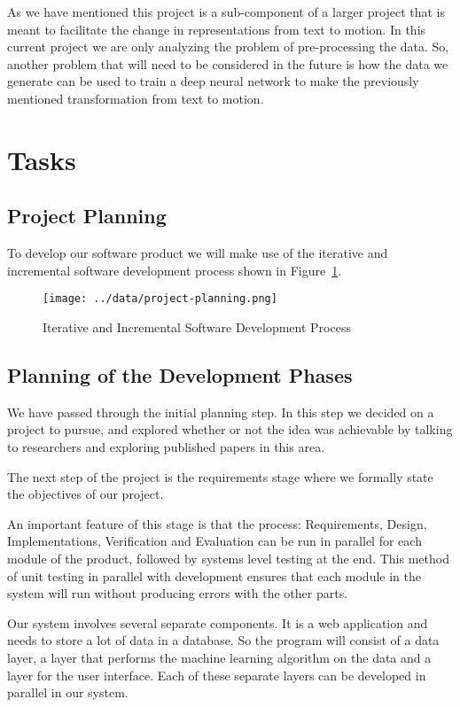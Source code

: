 \documentclass{scrreprt}
\begin{document}
{As we have mentioned this project is a sub-component of a larger project that
is meant to facilitate the change in representations from text to motion. In
this current project we are only analyzing the problem of pre-processing the
data. So, another problem that will need to be considered in the future is
how the data we generate can be used to train a deep neural network to make the
previously mentioned transformation from text to motion.}

\section{Tasks}

\subsection{Project Planning}

{To develop our software product we will make use of the iterative and
incremental software development process shown in Figure~\ref{fig-project-planning}.}

{\begin{figure}[!ht]
        \label{fig-project-planning}
        \caption{Iterative and Incremental Software Development Process}
        \texttt{[image: ../data/project-planning.png]}
\end{figure}}

\subsection{Planning of the Development Phases}

{We have passed through the initial planning step. In this step we decided on
a project to pursue, and explored whether or not the idea was achievable by
talking to researchers and exploring published papers in this area.}

{The next step of the project is the requirements stage where we formally state
the objectives of our project.}

{An important feature of this stage is that the process: Requirements, Design,
Implementations, Verification and Evaluation can be run in parallel for each
module of the product, followed by systems level testing at the end. This
method of unit testing in parallel with development ensures that each module in
the system will run without producing errors with the other parts.}

{Our system involves several separate components. It is a web
application and needs to store a lot of data in a database. So the
program will consist of a data layer, a layer that performs the machine
learning algorithm on the data and a layer for the user interface. Each
of these separate layers can be developed in parallel in our system.}
\end{document}
